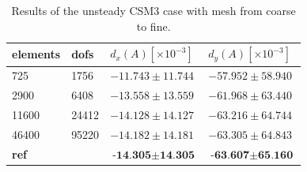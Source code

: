 \begin{table}[H]
\centering
\caption{Results of the unsteady CSM3 case with mesh from coarse to fine.}
\label{tab:CSM3}
\begin{tabular}{|l|l|l|l|}
\hline
elements & dofs & $d_x(A) [\times10^{-3}]$ & $d_y(A)[\times10^{-3}]$ \\ \hline
725 & 1756 & $-11.743 \pm 11.744$ & $-57.952 \pm 58.940$ \\ \hline
2900 & 6408 & $-13.558 \pm 13.559$ & $ -61.968 \pm  63.440 $ \\ \hline
11600 & 24412 & $ -14.128 \pm 14.127$ & $-63.216 \pm 64.744 $ \\ \hline
46400 & 95220 & $ -14.182 \pm 14.181 $ & $ -63.305 \pm 64.843 $ \\ \hline
\textbf{ref} &  & $ \textbf{-14.305} \pm \textbf{14.305} $ & $ \textbf{-63.607} \pm  \textbf{65.160} $ \\ \hline
\end{tabular}
\end{table}

